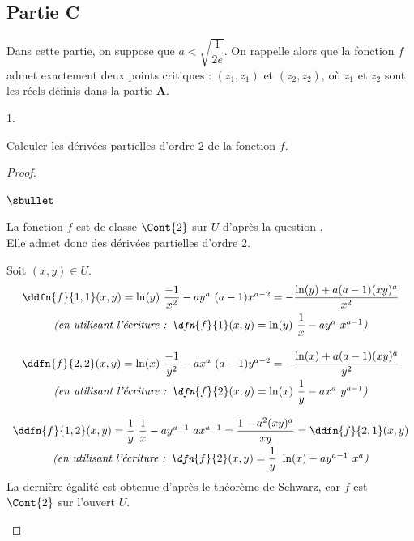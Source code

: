 \subsection*{Partie C}
\noindent
Dans cette partie, on suppose que $a<\sqrt{\dfrac{1}{2e}}$. On
rappelle alors que la fonction $f$ admet exactement deux points
critiques : $(z_1,z_1)$ et $(z_2,z_2)$, où $z_1$ et $z_2$ sont les
réels définis dans la partie {\bf A}.
\begin{noliste}{1.}
  \setcounter{enumi}{7}
\item Calculer les dérivées partielles d'ordre $2$ de la fonction $f$.
  
  \begin{proof}~
    \begin{noliste}{$\sbullet$}
    \item La fonction $f$ est de classe $\Cont{2}$ sur $U$ d'après la
      question .\\
      Elle admet donc des dérivées partielles d'ordre $2$.
  
    \item Soit $(x,y)\in U$.
      \[
      \begin{array}{c}
        \ddfn{f}{1,1}(x,y) = \ln(y) \ \dfrac{-1}{x^2} - ay^a \ (a-1)
        x^{a-2} = -\dfrac{\ln(y) + a(a-1)(xy)^a}{x^2}
        \\[.3cm]
        \text{\it (en utilisant l'écriture : $\dfn{f}{1}(x,y) = \ln(y) \
          \dfrac{1}{x} - a y^a \ x^{a-1}$)}
        \\[.6cm]
        \ddfn{f}{2,2}(x,y) = \ln(x) \ \dfrac{-1}{y^2} - ax^a \ (a-1)
        y^{a-2} = -\dfrac{\ln(x) + a(a-1)(xy)^a}{y^2}
        \\[.3cm]
        \text{\it (en utilisant l'écriture : $\dfn{f}{2}(x,y) = \ln(x) \
          \dfrac{1}{y} - a x^a \ y^{a-1}$)}
        \\[.6cm]
        \ddfn{f}{1,2}(x,y) = \dfrac{1}{y} \ \dfrac{1}{x} - a y^{a-1} \
        a x^{a-1} = \dfrac{1-a^2(xy)^{a}}{xy}=\ddfn{f}{2,1}(x,y)
        \\[.3cm]
        \text{\it (en utilisant l'écriture : $\dfn{f}{2}(x,y) =
          \dfrac{1}{y} \ \ln(x) - a y^{a-1} \ x^a$)}
      \end{array}
      \]
      La dernière égalité est obtenue d'après le théorème de Schwarz,
      car $f$ est $\Cont{2}$ sur l'ouvert $U$.%
      ~\\[-1.2cm]
    \end{noliste}
  \end{proof}
  

\end{noliste}

